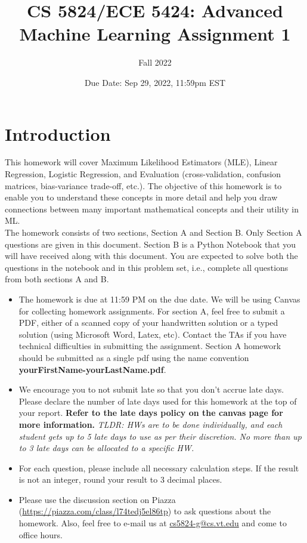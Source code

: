 \documentclass[11pt]{article}
\title{\textbf{CS 5824/ECE 5424: Advanced Machine Learning 
Assignment 1
 }}
\author{Fall 2022}
\date{Due Date: Sep 29, 2022, 11:59pm EST}
\begin{document}
\clearpage\maketitle
\thispagestyle{empty}

\section*{Introduction}

This homework will cover Maximum Likelihood Estimators (MLE), Linear Regression, Logistic Regression, and Evaluation (cross-validation, confusion matrices, bias-variance trade-off, etc.). The objective of this homework is to enable you to understand these concepts in more detail and help you draw connections between many important mathematical concepts and their utility in ML.\\

\noindent The homework consists of two sections, Section A and Section B. Only Section A questions are given in this document. Section B is a Python Notebook that you will have received along with this document. You are expected to solve both the questions in the notebook and in this problem set, i.e., complete all questions from both sections A and B.

\begin{itemize}

    \item The homework is due at 11:59 PM on the due date. We will be using Canvas for collecting homework assignments. For section A, feel free to submit a PDF, either of a scanned copy of your handwritten solution or a typed solution (using Microsoft Word, Latex, etc). Contact the TAs if you have technical difficulties in submitting the assignment. Section A homework should be submitted as a single pdf using the name convention \textbf{yourFirstName-yourLastName.pdf}.
    
    \item We encourage you to not submit late so that you don't accrue late days. Please declare the number of late days used for this homework at the top of your report. \textbf{Refer to the late days policy on the canvas page for more information.} \textit{TLDR: HWs are to be done individually, and each student gets up to 5 late days to use as per their discretion. No more than up to 3 late days can be allocated to a specific HW.}

    \item For each question, please include all necessary calculation steps. If the result is not an integer, round your result to 3 decimal places.
    
    \item Please use the discussion section on Piazza (\url{https://piazza.com/class/l74tedj5el86tp}) to ask questions about the homework. Also, feel free to e-mail us at \url{cs5824-g@cs.vt.edu} and come to office hours.

    
\end{itemize}
\end{document}
